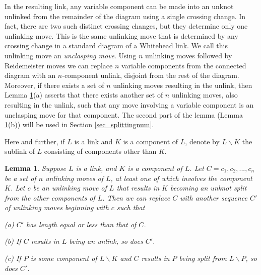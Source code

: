 \documentclass[12pt]{amsart}
\newtheorem{lemma}[thm]{Lemma}
\theoremstyle{definition}
\theoremstyle{remark}
\begin{document}
In the resulting link, any variable component can be made into an unknot unlinked from the remainder of the diagram using a single crossing change.
In fact, there are two such distinct crossing changes, but they determine only one unlinking move. This is the same unlinking move that is determined by any crossing change in a standard diagram of a Whitehead link.
We call this unlinking move an \emph{unclasping move}.
Using $n$ unlinking moves followed by Reidemeister moves we can replace $n$ variable components from the connected diagram with an $n$-component unlink, disjoint from the rest of the diagram.
Moreover, if there exists a set of $n$ unlinking moves resulting in the unlink, then Lemma \ref{lem_unlinking}(a) asserts that there exists another set of $n$ unlinking moves, also resulting in the unlink, such that any move involving a variable component is an unclasping move for that component.
The second part of the lemma (Lemma \ref{lem_unlinking}(b)) will be used in Section \ref{sec_splittingnum}.

Here and further, if $L$ is a link and $K$ is a component of $L$, denote by $L \backslash K$ the sublink of $L$ consisting of components other than $K$.







\begin{lemma}
\label{lem_unlinking}
Suppose $L$ is a link, and $K$ is a component of $L$.
Let $C=c_1, c_2, ..., c_n$ be a set of $n$ unlinking moves of $L$, at least one of which involves the component $K$.
Let $c$ be an unlinking move of $L$ that results in $K$ becoming an unknot split from the other components of $L$.
Then we can replace $C$ with another sequence $C'$ of unlinking moves beginning with $c$ such that
\vspace{0.1in}

(a) $C'$ has length equal or less than that of $C$.

(b) If $C$ results in $L$ being an unlink, so does $C'$.
\vspace{0.1in}

(c) If $P$ is some component of $L \backslash K$ and $C$ results in $P$ being split from $L \backslash P$, so does $C'$.
\end{lemma}
\end{document}
